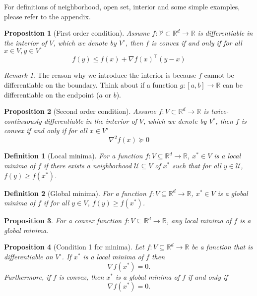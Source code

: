 \documentclass{article}
\newtheorem{definition}{Definition}
\newtheorem{proposition}{Proposition}
\newcommand{\R}{\mathbb{R}}
\DeclareMathOperator*{\1}{\mathbbm{1}}
\theoremstyle{definition}
\theoremstyle{remark}
\newtheorem{remark}{Remark}
\newcommand{\cU}{\mathcal{U}}
\newcommand{\cV}{\mathcal{V}}
\begin{document}
  \color{red}For definitions of neighborhood, open set, interior and some simple examples, please refer to the appendix.\color{black}
  
  \begin{proposition}[First order condition]
    Assume $f:\cV\subset \R^d\to \R$ is differentiable in the interior of $V$, which we denote by $V^\circ$, then $f$ is convex if and only if for all $x\in V, y\in V^\circ$
    \begin{equation*}
      f(y)\le f(x)+\nabla f(x)^\top (y-x)
    \end{equation*}
  \end{proposition}
  \begin{remark}
    The reason why we introduce the interior is because $f$ cannot be differentiable on the boundary. Think about if a function $g:[a,b]\to\R$ can be differentiable on the endpoint ($a$ or $b$).
  \end{remark}
  \begin{proposition}[Second order condition]
    Assume $f:V\subset \R^d\to \R$ is twice-continuously-differentiable in the interior of $V$, which we denote by $V^\circ$, then $f$ is convex if and only if for all $x\in V^\circ$
    \begin{equation*}
      \nabla^2f(x)\succeq 0
    \end{equation*}
  \end{proposition}
  \begin{definition}[Local minima]
    For a function $f:V\subseteq \R^d \to \R$, $x^*\in V$ is a local minima of $f$ if there exists a neighborhood $\cU\subseteq V$ of $x^*$ such that for all $y\in \cU$, $f(y)\ge f(x^*)$.
  \end{definition}
  \begin{definition}[Global minima]
    For a function $f:V\subseteq \R^d \to \R$, $x^*\in V$ is a global minima of $f$ if for all $y\in V$, $f(y)\ge f(x^*)$.
  \end{definition}
  \begin{proposition}
    For a convex function $f:V\subseteq \R^d \to \R$, any local minima of $f$ is a global minima.
  \end{proposition}
  \begin{proposition}[Condition 1 for minima]
    Let $f:V\subseteq \R^d \to \R$ be a function that is differentiable on $V^\circ$. If $x^*$ is a local minima of $f$ then 
    \begin{equation*}
      \nabla f(x^*)=0.
    \end{equation*}
    Furthermore, if $f$ is convex, then $x^*$ is a global minima of $f$ if and only if 
    \begin{equation*}
      \nabla f(x^*)=0.
    \end{equation*}
  \end{proposition}
\end{document}
